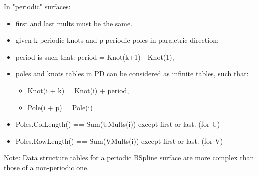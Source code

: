 \documentclass[a4paper]{article}
\begin{document}
In "periodic" surfaces:

\begin{itemize}
  \item first and last mults must be the same.
  \item given k periodic knots and p periodic poles in para,etric direction:
  \item period is such that: period = Knot(k+1) - Knot(1),
  \item poles and knots tables in PD can be considered as infinite tables, such that:
  \begin{itemize}
    \item Knot(i + k) = Knot(i) + period,
    \item Pole(i + p) = Pole(i)
  \end{itemize}
  \item Poles.ColLength() == Sum(UMults(i)) except first or last. (for U)
  \item Poles.RowLength() == Sum(VMults(i)) except first or last. (for V)
\end{itemize}

Note: Data structure tables for a periodic BSpline surface are more complex than those of a non-periodic one.
\end{document}
